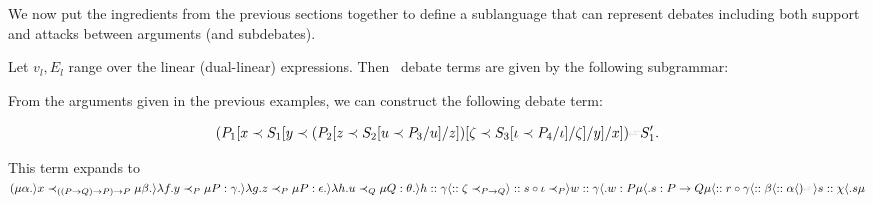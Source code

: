 \documentclass{IOS-Book-Article}
\begin{document}
We now put the ingredients from the previous sections together to define a sublanguage that can represent debates including both support and attacks between arguments (and subdebates).

\begin{definition}
  Let $v_l,E_l$ range over the linear (dual-linear) \matilda expressions. Then \ACDC\ debate terms are given by the following subgrammar:
  \begin{grammar}[Debates][H]
  \end{grammar}
\end{definition}

\begin{example}
  From the arguments given in the previous examples, we can construct the following debate term:

    \[(P_1[x \prec S_1 [y \prec (P_2 [z \prec S_2 [u \prec P_3/u]/z]) [\zeta \prec S_3 [\iota \prec P_4/\iota]/\zeta]/y]/x])\leftattack S_1'.\]

    This term expands to 
$(\mu \alpha.\rangle x \prec_{((P\rightarrow Q)\rightarrow P)\rightarrow P} \mu \beta. \rangle \lambda f. y \prec_P \mu P:\gamma.\rangle \lambda g. z \prec_P \mu P:\epsilon.\rangle \lambda h. u \prec_Q \mu Q:\theta.\rangle h :: \gamma \langle :: \zeta \prec_{P\rightarrow Q} \rangle :: s \circ \iota \prec_P \rangle w :: \gamma \langle. w:P \mu \langle. s:P \rightarrow Q \mu \langle :: r \circ \gamma \langle :: \beta\langle
 :: \alpha\langle)\leftattack \rangle s :: \chi \langle.s\mu$

  
\end{example}
\end{document}
